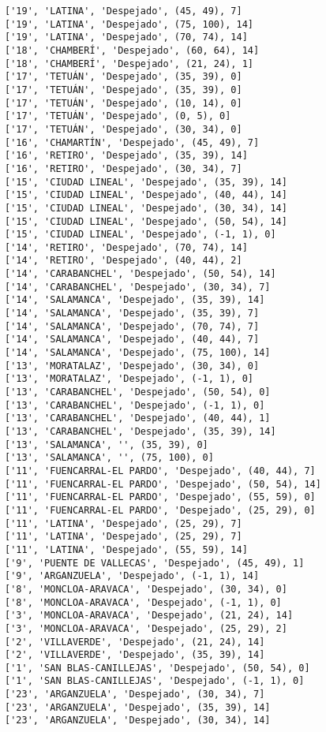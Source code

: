 \documentclass[11pt]{article}
\begin{document}
\begin{Verbatim}[commandchars=\\\{\}]
['19', 'LATINA', 'Despejado', (45, 49), 7]
['19', 'LATINA', 'Despejado', (75, 100), 14]
['19', 'LATINA', 'Despejado', (70, 74), 14]
['18', 'CHAMBERÍ', 'Despejado', (60, 64), 14]
['18', 'CHAMBERÍ', 'Despejado', (21, 24), 1]
['17', 'TETUÁN', 'Despejado', (35, 39), 0]
['17', 'TETUÁN', 'Despejado', (35, 39), 0]
['17', 'TETUÁN', 'Despejado', (10, 14), 0]
['17', 'TETUÁN', 'Despejado', (0, 5), 0]
['17', 'TETUÁN', 'Despejado', (30, 34), 0]
['16', 'CHAMARTÍN', 'Despejado', (45, 49), 7]
['16', 'RETIRO', 'Despejado', (35, 39), 14]
['16', 'RETIRO', 'Despejado', (30, 34), 7]
['15', 'CIUDAD LINEAL', 'Despejado', (35, 39), 14]
['15', 'CIUDAD LINEAL', 'Despejado', (40, 44), 14]
['15', 'CIUDAD LINEAL', 'Despejado', (30, 34), 14]
['15', 'CIUDAD LINEAL', 'Despejado', (50, 54), 14]
['15', 'CIUDAD LINEAL', 'Despejado', (-1, 1), 0]
['14', 'RETIRO', 'Despejado', (70, 74), 14]
['14', 'RETIRO', 'Despejado', (40, 44), 2]
['14', 'CARABANCHEL', 'Despejado', (50, 54), 14]
['14', 'CARABANCHEL', 'Despejado', (30, 34), 7]
['14', 'SALAMANCA', 'Despejado', (35, 39), 14]
['14', 'SALAMANCA', 'Despejado', (35, 39), 7]
['14', 'SALAMANCA', 'Despejado', (70, 74), 7]
['14', 'SALAMANCA', 'Despejado', (40, 44), 7]
['14', 'SALAMANCA', 'Despejado', (75, 100), 14]
['13', 'MORATALAZ', 'Despejado', (30, 34), 0]
['13', 'MORATALAZ', 'Despejado', (-1, 1), 0]
['13', 'CARABANCHEL', 'Despejado', (50, 54), 0]
['13', 'CARABANCHEL', 'Despejado', (-1, 1), 0]
['13', 'CARABANCHEL', 'Despejado', (40, 44), 1]
['13', 'CARABANCHEL', 'Despejado', (35, 39), 14]
['13', 'SALAMANCA', '', (35, 39), 0]
['13', 'SALAMANCA', '', (75, 100), 0]
['11', 'FUENCARRAL-EL PARDO', 'Despejado', (40, 44), 7]
['11', 'FUENCARRAL-EL PARDO', 'Despejado', (50, 54), 14]
['11', 'FUENCARRAL-EL PARDO', 'Despejado', (55, 59), 0]
['11', 'FUENCARRAL-EL PARDO', 'Despejado', (25, 29), 0]
['11', 'LATINA', 'Despejado', (25, 29), 7]
['11', 'LATINA', 'Despejado', (25, 29), 7]
['11', 'LATINA', 'Despejado', (55, 59), 14]
['9', 'PUENTE DE VALLECAS', 'Despejado', (45, 49), 1]
['9', 'ARGANZUELA', 'Despejado', (-1, 1), 14]
['8', 'MONCLOA-ARAVACA', 'Despejado', (30, 34), 0]
['8', 'MONCLOA-ARAVACA', 'Despejado', (-1, 1), 0]
['3', 'MONCLOA-ARAVACA', 'Despejado', (21, 24), 14]
['3', 'MONCLOA-ARAVACA', 'Despejado', (25, 29), 2]
['2', 'VILLAVERDE', 'Despejado', (21, 24), 14]
['2', 'VILLAVERDE', 'Despejado', (35, 39), 14]
['1', 'SAN BLAS-CANILLEJAS', 'Despejado', (50, 54), 0]
['1', 'SAN BLAS-CANILLEJAS', 'Despejado', (-1, 1), 0]
['23', 'ARGANZUELA', 'Despejado', (30, 34), 7]
['23', 'ARGANZUELA', 'Despejado', (35, 39), 14]
['23', 'ARGANZUELA', 'Despejado', (30, 34), 14]

\end{Verbatim}
\end{document}
